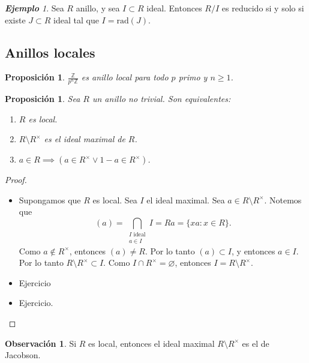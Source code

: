\documentclass{article}
\newtheorem{proposition}[theorem]{Proposición}
\theoremstyle{definition}
\newtheorem*{obs}{Observación}
\theoremstyle{remark}
\newtheorem{example}[theorem]{\textbf{Ejemplo}}
\numberwithin{equation}{section}
\newcommand{\Z}{\mathbb{Z}}
\newcommand{\rad}{\mathrm{rad}}
\newcommand{\znz}[1]{\frac{\Z}{#1 \Z}}
\begin{document}
\begin{example}
  Sea $R$ anillo, y sea $I \subset R$ ideal. Entonces $R/I$ es reducido si y solo si existe $J \subset R$ ideal tal que $I = \rad(J)$.
\end{example}

\newpage
\subsection{Anillos locales}

\begin{proposition}
  $\znz{p^n}$ es anillo local para todo $p$ primo y $n \geq 1$.
\end{proposition}

\begin{proposition}
  Sea $R$ un anillo no trivial. Son equivalentes: 
  \begin{enumerate}[(1)]
    \item $R$ es local.
    \item $R \setminus R^\times$ es el ideal maximal de $R$.
    \item $a \in R \implies (a \in R^\times \lor 1-a \in R^\times)$.
  \end{enumerate}
\end{proposition}
\begin{proof}
  \ \begin{itemize}
    \item {} Supongamos que $R$ es local. Sea $I$ el ideal maximal. Sea $a \in R \setminus R^\times$. Notemos que 
    \[ (a) = \bigcap_{\substack{I \text{ ideal} \\ a \in I}} I = Ra = \{xa \colon x \in R\}. \]
    Como $a \notin R^\times$, entonces $(a) \neq R$. Por lo tanto $(a) \subset I$, y entonces $a \in I$. Por lo tanto $R \setminus R^\times \subset I$.
    Como $I \cap R^\times  = \varnothing$, entonces $I = R \setminus R^\times$.
    \item {} Ejercicio %
    \item {} Ejercicio. %
  \end{itemize}
\end{proof}

\begin{obs}
  Si $R$ es local, entonces el ideal maximal $R \setminus R^\times$ es el de Jacobson.
\end{obs}
\end{document}
